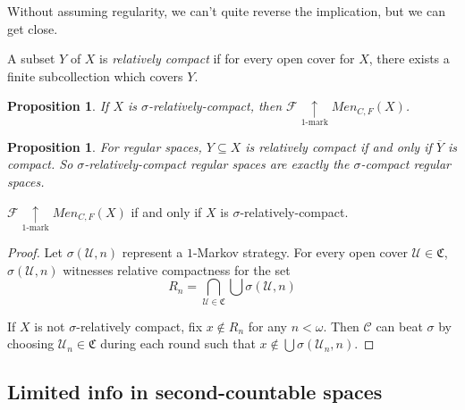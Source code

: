 \documentclass{beamer}
\newtheorem{proposition}[theorem]{Proposition}
\theoremstyle{definition}
\newcommand{\kmarkwin}[1]{\underset{#1\text{-mark}}{\uparrow}}
\newcommand{\mengame}[1]{Men_{C,F}(#1)}
\newcommand{\cl}[1]{\overline{#1}}
\newcommand{\<}{\langle}
\renewcommand{\>}{\rangle}
\newcommand{\mc}[1]{\mathcal{#1}}
\newcommand{\pl}[1]{\mathscr{#1}}
\newcommand{\term}{\textit}
\begin{document}
\begin{frame}
  Without assuming regularity, we can't quite reverse the implication, but
  we can get close.

  \pause

  \begin{definition}
    A subset $Y$ of $X$ is \term{relatively compact} if for every open cover
    for $X$, there exists a finite subcollection which covers $Y$.
  \end{definition}

  \begin{proposition}
    If $X$ is $\sigma$-relatively-compact, then $\pl F \kmarkwin{1}\mengame X$.
  \end{proposition}

  \pause

  \begin{proposition}
    For regular spaces, $Y\subseteq X$ is relatively compact if and only if
    $\cl Y$ is compact. So $\sigma$-relatively-compact regular spaces are
    exactly the $\sigma$-compact regular spaces.
  \end{proposition}
\end{frame}

\begin{frame}

  \begin{theorem}
    $\pl F \kmarkwin{1}\mengame X$ if and only if $X$ is
    $\sigma$-relatively-compact.
  \end{theorem}

  \pause

  \begin{proof}
    Let $\sigma(\mc U, n)$ represent a $1$-Markov strategy.
    For every open cover $\mc U\in\mathfrak C$, $\sigma(\mc{U},n)$
    witnesses relative compactness for the set
      \[
        R_n
          =
        \bigcap_{\mc U\in\mathfrak C}\bigcup \sigma(\mc U,n)
      \]

    \pause

    If $X$ is not $\sigma$-relatively compact, fix $x \not\in R_n$ for any
    $n<\omega$. Then $\pl C$ can beat
    $\sigma$ by choosing $\mc{U}_n\in\mathfrak{C}$ during each round
    such that $x\not\in \bigcup\sigma(\mc{U}_n,n)$.
  \end{proof}
\end{frame}

\subsection{Limited info in second-countable spaces}
\end{document}
